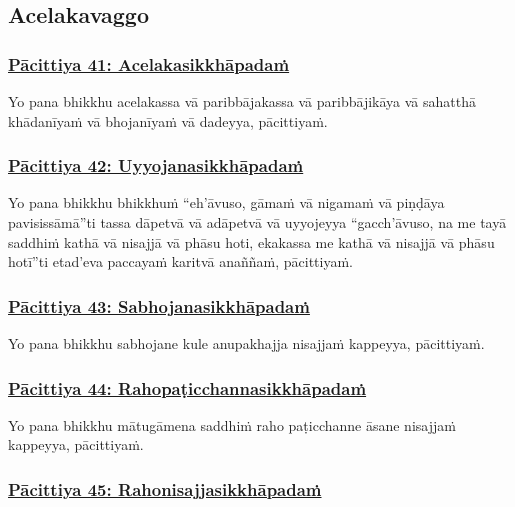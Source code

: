 \subsection{Acelakavaggo}
\vspace{0.2cm}

\subsubsection*{\hyperref[exp41]{Pācittiya 41: Acelakasikkhāpadaṁ}}
\label{pac41}

Yo pana bhikkhu acelakassa vā paribbājakassa vā paribbājikāya vā sahatthā khādanīyaṁ vā bhojanīyaṁ vā dadeyya, pācittiyaṁ.

\subsubsection*{\hyperref[exp42]{Pācittiya 42: Uyyojanasikkhāpadaṁ}}
\label{pac42}

Yo pana bhikkhu bhikkhuṁ “eh'āvuso, gāmaṁ vā nigamaṁ vā piṇḍāya pavisissāmā”ti tassa dāpetvā vā adāpetvā vā uyyojeyya “gacch'āvuso, na me tayā saddhiṁ kathā vā nisajjā vā phāsu hoti, ekakassa me kathā vā nisajjā vā phāsu hotī”ti etad'eva paccayaṁ karitvā anaññaṁ, pācittiyaṁ.

\subsubsection*{\hyperref[exp43]{Pācittiya 43: Sabhojanasikkhāpadaṁ}}
\label{pac43}

Yo pana bhikkhu sabhojane kule anupakhajja nisajjaṁ kappeyya, pācittiyaṁ.

\subsubsection*{\hyperref[exp44]{Pācittiya 44: Rahopaṭicchannasikkhāpadaṁ}}
\label{pac44}

Yo pana bhikkhu mātugāmena saddhiṁ raho paṭicchanne āsane nisajjaṁ kappeyya, pācittiyaṁ.

\subsubsection*{\hyperref[exp45]{Pācittiya 45: Rahonisajjasikkhāpadaṁ}}
\label{pac45}

